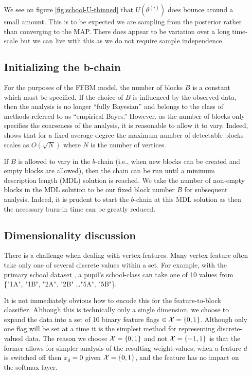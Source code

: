 We see on figure \ref{fig:school-U-thinned} that $U(\theta^{(i)})$ does bounce around a small amount. This is to be expected we are sampling from the posterior rather than converging to the MAP. There does appear to be variation over a long time-scale but we can live with this as we do not require sample independence.
\FloatBarrier
\subsection{Initializing the b-chain}

For the purposes of the FFBM model, the number of blocks $B$ is a constant 
which must be specified. If the choice of $B$ is influenced 
by the observed data, then the analysis is no longer ``fully Bayesian''
and belongs to the class of methods referred to as ``empirical Bayes.''
However, as the number of blocks only specifies the coarseness of the 
analysis, it is reasonable to allow it to vary. Indeed, 
\citet{peixoto-determine-B} shows that for a fixed 
average degree the maximum number of detectable blocks scales 
as $O(\sqrt{N})$ where $N$ is the number of vertices.

If $B$ is allowed to vary in the $b$-chain (i.e.,
when new blocks can be created and empty blocks are allowed),
then the chain can be run until a minimum description 
length (MDL) solution is reached. We take the number of non-empty blocks 
in the MDL solution to be our fixed block number $B$ for subsequent analysis. 
Indeed, it is prudent to start the $b$-chain at this MDL solution as then 
the necessary burn-in time can be greatly reduced.

\subsection{Dimensionality discussion}
\label{appdx:dimension}

There is a challenge when dealing with vertex-features. Many vertex feature often take only one of several discrete values within a set. For example, with the primary school dataset \cite{schools}, a pupil's school-class can take one of 10 values from \{"1A", "1B", "2A", "2B" \dots "5A", "5B"\}.

It is not immediately obvious how to encode this for the feature-to-block classifier. Although this is technically only a single dimension, we choose to expand the data into a set of 10 binary feature flags $\in \mathcal{X} = \{0, 1\}$. Although only one flag will be set at a time it is the simplest method for representing discrete-valued data. The reason we choose $\mathcal{X}=\{0, 1\}$ and not $\mathcal{X} = \{-1, 1\}$ is that the former allows for simpler analysis of the resulting weight values; when a feature $d$ is switched off then $x_{d}=0$ given $\mathcal{X} = \{0, 1\}$, and the feature has no impact on the softmax layer.

